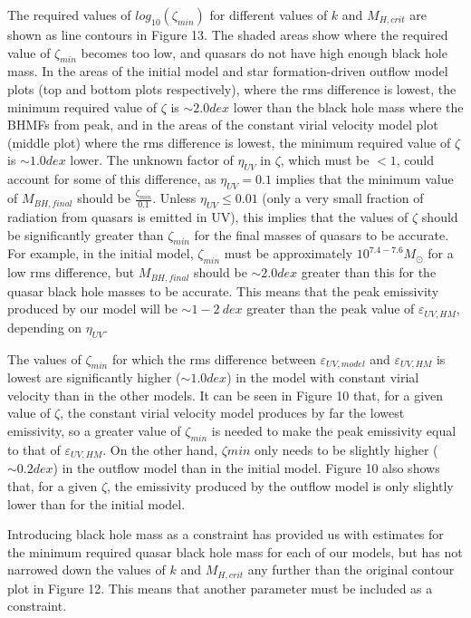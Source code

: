 \documentclass[12pt]{article}%
\begin{document}
The required values of $log_{10}(\zeta_{min})$ for different values of $k$ and $M_{H,crit}$ are shown as line contours in Figure 13. The shaded areas show where the required value of $\zeta_{min}$ becomes too low, and quasars do not have high enough black hole mass. In the areas of the initial model and star formation-driven outflow model plots (top and bottom plots respectively), where the rms difference is lowest, the minimum required val\-ue of $\zeta$ is $\sim2.0dex$ lower than the black hole mass where the BHMFs from \citeauthor{BH_mass_fns} peak, and in the areas of the constant virial velocity model plot (middle plot) where the rms difference is lowest, the minimum required val\-ue of $\zeta$ is $\sim1.0dex$ lower. The unknown factor of $\eta_{UV}$ in $\zeta$, which must be $<1$, could account for some of this difference, as $\eta_{UV}=0.1$ implies that the minimum value of $M_{BH,final}$ should be $\frac{\zeta_{min}}{0.1}$. Unless $\eta_{UV}\leq0.01$ (only a very small fraction of radiation from quasars is emitted in UV), this implies that the values of $\zeta$ should be significantly greater than $\zeta_{min}$ for the final masses of quasars to be accurate. For example, in the initial model, $\zeta_{min}$ must be approximately $10^{7.4-7.6}M_\odot$ for a low rms difference, but $M_{BH,final}$ should be $\sim2.0dex$ greater than this for the quasar black hole mass\-es to be accurate. This means that the peak emissivity produced by our model will be $\sim1-2\:dex$ greater than the peak value of $\varepsilon_{UV,HM}$, depending on $\eta_{UV}$.\par

The values of $\zeta_{min}$ for which the rms difference between $\varepsilon_{UV,model}$ and $\varepsilon_{UV,HM}$ is lowest are significantly higher ($\sim1.0dex$) in the model with constant virial velocity than in the other models. It can be seen in Figure 10 that, for a given value of $\zeta$, the constant virial velocity model produces by far the lowest emissivity, so a greater value of $\zeta_{min}$ is needed to make the peak emissivity equal to that of $\varepsilon_{UV,HM}$. On the other hand, $\zeta{min}$ only needs to be slig\-htly higher ($\sim0.2dex$) in the outflow model than in the initial model. Figure 10 also shows that, for a given $\zeta$, the emissivity produced by the outflow model is only slightly lower than for the initial model.\par

Introducing black hole mass as a constraint has provided us with estimates for the minimum required quasar black hole mass for each of our models, but has not narrowed down the values of $k$ and $M_{H,crit}$ any further than the original contour plot in Figure 12. This means that another parameter must be included as a constraint.
\end{document}
